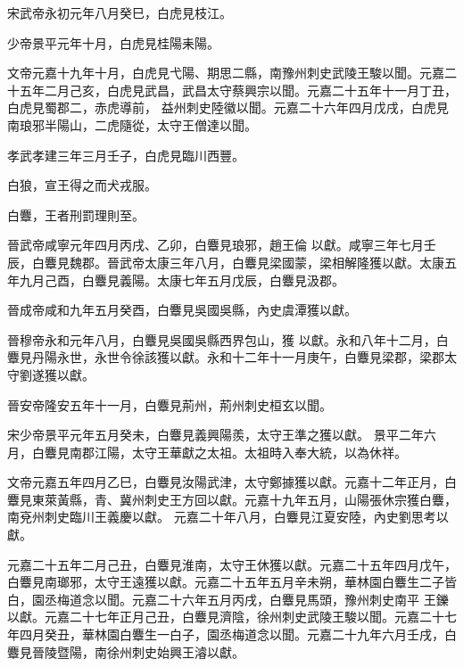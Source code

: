 \begin{pinyinscope}
 宋武帝永初元年八月癸巳，白虎見枝江。



 少帝景平元年十月，白虎見桂陽耒陽。



 文帝元嘉十九年十月，白虎見弋陽、期思二縣，南豫州刺史武陵王駿以聞。元嘉二十五年二月己亥，白虎見武昌，武昌太守蔡興宗以聞。元嘉二十五年十一月丁丑，白虎見蜀郡二，赤虎導前，
 益州刺史陸徽以聞。元嘉二十六年四月戊戌，白虎見南琅邪半陽山，二虎隨從，太守王僧達以聞。



 孝武孝建三年三月壬子，白虎見臨川西豐。


白狼，宣王得之而犬戎服。



 白麞，王者刑罰理則至。



 晉武帝咸寧元年四月丙戌、乙卯，白麞見琅邪，趙王倫
 以獻。咸寧三年七月壬辰，白麞見魏郡。晉武帝太康三年八月，白麞見梁國蒙，梁相解隆獲以獻。太康五年九月己酉，白麞見義陽。太康七年五月戊辰，白麞見汲郡。



 晉成帝咸和九年五月癸酉，白麞見吳國吳縣，內史虞潭獲以獻。



 晉穆帝永和元年八月，白麞見吳國吳縣西界包山，獲
 以獻。永和八年十二月，白麞見丹陽永世，永世令徐該獲以獻。永和十二年十一月庚午，白麞見梁郡，梁郡太守劉遂獲以獻。



 晉安帝隆安五年十一月，白麞見荊州，荊州刺史桓玄以聞。



 宋少帝景平元年五月癸未，白麞見義興陽羨，太守王準之獲以獻。
 景平二年六月，白麞見南郡江陽，太守王華獻之太祖。太祖時入奉大統，以為休祥。



 文帝元嘉五年四月乙巳，白麞見汝陽武津，太守鄭據獲以獻。元嘉十二年正月，白麞見東萊黃縣，青、冀州刺史王方回以獻。元嘉十九年五月，山陽張休宗獲白麞，南兗州刺史臨川王義慶以獻。
 元嘉二十年八月，白麞見江夏安陸，內史劉思考以獻。



 元嘉二十五年二月己丑，白麞見淮南，太守王休獲以獻。元嘉二十五年四月戊午，白麞見南瑯邪，太守王遠獲以獻。元嘉二十五年五月辛未朔，華林園白麞生二子皆白，園丞梅道念以聞。元嘉二十六年五月丙戌，白麞見馬頭，豫州刺史南平
 王鑠以獻。元嘉二十七年正月己丑，白麞見濟陰，徐州刺史武陵王駿以聞。元嘉二十七年四月癸丑，華林園白麞生一白子，園丞梅道念以聞。元嘉二十九年六月壬戌，白麞見晉陵暨陽，南徐州刺史始興王濬以獻。




\end{pinyinscope}

